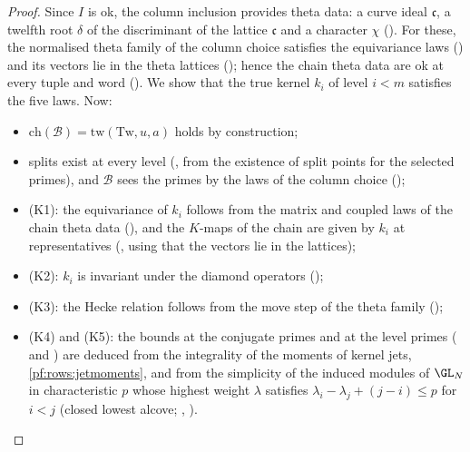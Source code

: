 \begin{proof}
Since $I$ is ok, the column inclusion provides theta data: a curve ideal $\mathfrak c$, a twelfth root $\delta$ of the
discriminant of the lattice $\mathfrak c$ and a character $\chi$ (). For these, the
normalised theta family of the column choice satisfies the equivariance laws
() and its vectors lie in the theta lattices
(); hence the chain theta data are ok at every tuple and
word (). We show that the true kernel $k_i$ of level $i<m$ satisfies the five
laws. Now:
\begin{itemize}
\item $\mathrm{ch}(\mathcal B)=\mathrm{tw}(\mathrm{Tw},u,a)$ holds by construction;
\item splits exist at every level (, from the existence of split points for
the selected primes), and $\mathcal B$ sees the primes by the laws of the column choice
();
\item (K1): the equivariance of $k_i$ follows from the matrix and coupled laws of the chain theta data
(), and the $K$-maps of the chain are given by $k_i$ at representatives
(, using that the vectors lie in the lattices);
\item (K2): $k_i$ is invariant under the diamond operators ();
\item (K3): the Hecke relation follows from the move step of the theta family
();
\item (K4) and (K5): the bounds at the conjugate primes and at the level primes
( and )
are deduced from the integrality of the moments of kernel jets, \cref{pf:rows:jetmoments}, and from the simplicity of the
induced modules of $\GL_N$ in characteristic $p$ whose highest weight $\lambda$ satisfies $\lambda_i-\lambda_j+(j-i)\le p$ for
$i<j$ (closed lowest alcove; \cite[II, \S5]{Jantzen2003}, ).
\qedhere
\end{itemize}
\end{proof}


